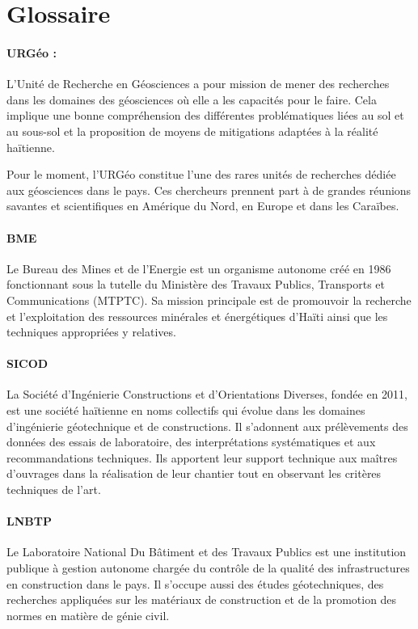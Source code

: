\section{Glossaire}
\paragraph{URGéo :}
L'Unité de Recherche en Géosciences a pour mission de mener des
recherches dans les domaines des géosciences où elle a les capacités
pour le faire. Cela implique une bonne compréhension des différentes 
problématiques liées au sol et au sous-sol et la proposition de moyens
de mitigations adaptées à la réalité haïtienne.
\par 
Pour le moment, l’URGéo constitue l’une des rares unités de recherches
dédiée aux géosciences dans le pays. Ces chercheurs prennent part à de
grandes réunions savantes et scientifiques en Amérique du Nord, en 
Europe et dans les Caraïbes.

\paragraph{BME}
Le Bureau des Mines et de l’Energie est un organisme autonome créé en 
1986 fonctionnant sous la tutelle du Ministère des Travaux Publics, Transports 
et Communications (MTPTC). Sa mission principale est de promouvoir la recherche
et l'exploitation des ressources minérales et énergétiques d'Haïti ainsi que les 
techniques appropriées y relatives.

\paragraph{SICOD}
La  Société d’Ingénierie Constructions et d’Orientations Diverses,
fondée en 2011, est une société haïtienne en noms collectifs qui évolue dans 
les domaines d’ingénierie géotechnique et de constructions.
Il s'adonnent aux prélèvements des données des essais de laboratoire, des 
interprétations systématiques et aux recommandations techniques. 
Ils apportent leur support technique aux maîtres d'ouvrages dans la réalisation 
de leur chantier tout en observant les critères techniques de l'art.

\paragraph{LNBTP}
Le Laboratoire National Du Bâtiment et des Travaux Publics est une institution 
publique à gestion autonome chargée du contrôle de
la qualité des infrastructures en construction dans le pays. Il s'occupe 
aussi des études géotechniques, des recherches appliquées sur les matériaux de 
construction et de la promotion des normes en matière de génie civil.

